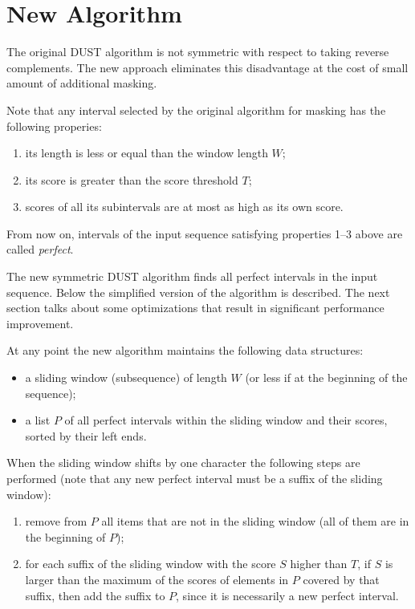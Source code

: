 \documentclass{article}
\begin{document}
\section{New Algorithm}

The original DUST algorithm is not symmetric with respect to taking reverse
complements. The new approach eliminates this disadvantage at the cost of 
small amount of additional masking.

Note that any interval selected by the original algorithm for masking has 
the following properies:

\begin{enumerate}
\item its length is less or equal than the window length $W$;
\item its score is greater than the score threshold $T$;
\item scores of all its subintervals are at most as high as its own score.
\end{enumerate}

From now on, intervals of the input sequence satisfying properties 1--3 above
are called {\em perfect}.

The new symmetric DUST algorithm finds all perfect intervals in the input 
sequence. Below the simplified version of the algorithm is described. The next 
section talks about some optimizations that result in significant performance 
improvement.

At any point the new algorithm maintains the following data structures:

\begin{itemize}
\item a sliding window (subsequence) of length $W$ (or less if at the 
      beginning of the sequence);
\item a list $P$ of all perfect intervals within the sliding window and 
      their scores, sorted by their left ends.
\end{itemize}

When the sliding window shifts by one character the following steps are 
performed (note that any new perfect interval must be a suffix of the 
sliding window):

\begin{enumerate}
\item remove from $P$ all items that are not in the sliding window (all of them
      are in the beginning of $P$);
\item for each suffix of the sliding window with the score $S$ higher than $T$,
      if $S$ is larger than the maximum of the scores of elements in $P$ covered 
      by that suffix, then add the suffix to $P$, since it is necessarily a 
      new perfect interval.
\end{enumerate}
\end{document}

